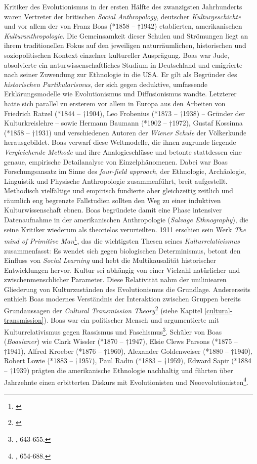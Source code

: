 \documentclass[openany,twoside,twocolumn]{book}
\let\rmarkdownfootnote\footnote%
\def\footnote{\protect\rmarkdownfootnote}
\begin{document}
Kritiker des Evolutionismus in der ersten Hälfte des zwanzigsten Jahrhunderts waren Vertreter der britischen \emph{Social Anthropology}, deutscher \emph{Kulturgeschichte} und vor allem der von Franz Boas (*1858 -- †1942) etablierten, amerikanischen \emph{Kulturanthropologie}. Die Gemeinsamkeit dieser Schulen und Strömungen liegt an ihrem traditionellen Fokus auf den jeweiligen naturräumlichen, historischen und soziopolitischen Kontext einzelner kultureller Ausprägung. Boas war Jude, absolvierte ein naturwissenschaftliches Studium in Deutschland und emigrierte nach seiner Zuwendung zur Ethnologie in die USA. Er gilt als Begründer des \emph{historischen Partikularismus}, der sich gegen deduktive, umfassende Erklärungsmodelle wie Evolutionismus und Diffusionismus wandte. Letzterer hatte sich parallel zu ersterem vor allem in Europa aus den Arbeiten von Friedrich Ratzel (*1844 -- †1904), Leo Frobenius (*1873 -- †1938) -- Gründer der Kulturkreislehre -- sowie Hermann Baumann (*1902 -- †1972), Gustaf Kossinna (*1858 -- †1931) und verschiedenen Autoren der \emph{Wiener Schule} der Völkerkunde herausgebildet. Boas verwarf diese Weltmodelle, die ihnen zugrunde liegende \emph{Vergleichende Methode} und ihre Analogieschlüsse und betonte stattdessen eine genaue, empirische Detailanalyse von Einzelphänomenen. Dabei war Boas Forschungsansatz im Sinne des \emph{four-field approach}, der Ethnologie, Archäologie, Linguistik und Physische Anthropologie zusammenführt, breit aufgestellt. Methodisch vielfältige und empirisch fundierte aber gleichzeitig zeitlich und räumlich eng begrenzte Fallstudien sollten den Weg zu einer induktiven Kulturwissenschaft ebnen. Boas begründete damit eine Phase intensiver Datenaufnahme in der amerikanischen Anthropologie (\emph{Salvage Ethnography}), die seine Kritiker wiederum als theorielos verurteilten. 1911 erschien sein Werk \emph{The mind of Primitive Man}\footnote{\textcite{Boasmindprimitiveman1911}}, das die wichtigsten Thesen seines \emph{Kulturrelativismus} zusammenfasst: Es wendet sich gegen biologischen Determinismus, betont den Einfluss von \emph{Social Learning} und hebt die Multikausalität historischer Entwicklungen hervor. Kultur sei abhängig von einer Vielzahl natürlicher und zwischenmenschlicher Parameter. Diese Relativität nahm der uniliniearen Gliederung von Kulturzuständen des Evolutionismus die Grundlage. Andererseits enthielt Boas modernes Verständnis der Interaktion zwischen Gruppen bereits Grundaussagen der \emph{Cultural Transmission Theory}\footnote{\textcite{obrien_epistemological_2002}} (siehe Kapitel \ref{cultural-transmission}). Boas war ein politischer Mensch und argumentierte mit Kulturrelativismus gegen Rassismus und Faschismus\footnote{\textcite{petermann_geschichte_2004}, 643-655.}. Schüler von Boas (\emph{Boasianer}) wie Clark Wissler (*1870 -- †1947), Elsie Clews Parsons (*1875 -- †1941), Alfred Kroeber (*1876 -- †1960), Alexander Goldenweiser (*1880 -- †1940), Robert Lowie (*1883 -- †1957), Paul Radin (*1883 -- †1959), Edward Sapir (*1884 -- †1939) prägten die amerikanische Ethnologie nachhaltig und führten über Jahrzehnte einen erbitterten Diskurs mit Evolutionisten und Neoevolutionisten\footnote{\textcite{petermann_geschichte_2004}, 654-688.}.
\end{document}
